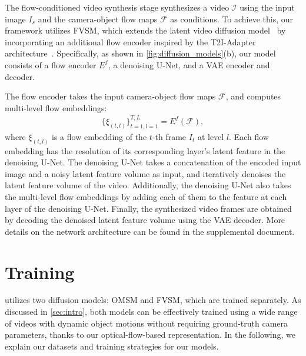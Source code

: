 The flow-conditioned video synthesis stage synthesizes a video $\mathcal{I}$ using the input image $I_s$ and the camera-object flow maps $\mathcal{F}$ as conditions.
To achieve this, our framework utilizes FVSM, which extends the latent video diffusion model~\cite{blattmann2023stable} by incorporating an additional flow encoder inspired by the T2I-Adapter architecture~\cite{mou2024t2i}.
Specifically, as shown in \cref{fig:diffusion_models}(b), our model consists of a flow encoder $E^f$, a denoising U-Net, and a VAE encoder and decoder.

The flow encoder takes the input camera-object flow maps $\mathcal{F}$, and computes multi-level flow embeddings:
\begin{equation}
\begin{aligned}
\{\xi_{(t,l)}\}^{T,L}_{t=1,l=1}=E^f(\mathcal{F}),
\end{aligned}
\end{equation}
where $\xi_{(t,l)}$ is a flow embedding of the $t$-th frame $I_t$ at level $l$. Each flow embedding has the resolution of its corresponding layer's latent feature in the denoising U-Net.
The denoising U-Net takes a concatenation of the encoded input image and a noisy latent feature volume as input, and iteratively denoises the latent feature volume of the video.
Additionally, the denoising U-Net also takes the multi-level flow embeddings by adding each of them to the feature at each layer of the denoising U-Net.
Finally, the synthesized video frames are obtained by decoding the denoised latent feature volume using the VAE decoder.
More details on the network architecture can be found in the supplemental document.

\section{\MethodName{} Training}
\label{sec:Training}






\MethodName{} utilizes two diffusion models: OMSM and FVSM, which are trained separately. As discussed in \cref{sec:intro}, both models can be effectively trained using a wide range of videos with dynamic object motions without requiring ground-truth camera parameters, thanks to our optical-flow-based representation.
In the following, we explain our datasets and training strategies for our models.

